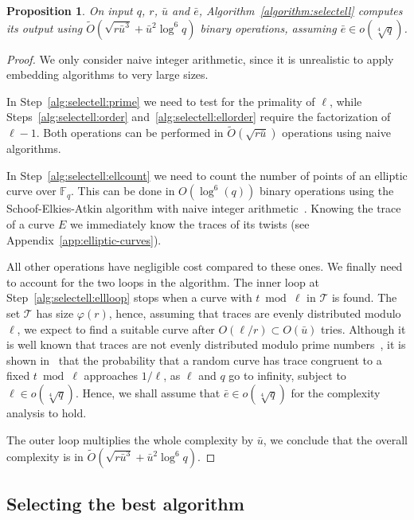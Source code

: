 \documentclass[12pt]{article}
\theoremstyle{plain}
\newtheorem{proposition}[theorem]{Proposition}
\theoremstyle{definition}
\newcommand{\tildO}{\tilde{O}}
\def\F{\ensuremath{\mathbb{F}}}
\def\euler{\ensuremath{\varphi}}
\newcounter{algorithm}
\begin{document}
\begin{proposition}
  On input $q$, $r$, $\bar{u}$ and $\bar{e}$,
  Algorithm~\ref{algorithm:selectell} computes its output using
  $\tildO\left(\sqrt{r\bar{u}^3} + \bar{u}^2\log^6{q}\right)$ binary
  operations, assuming $\bar{e}\in o(\sqrt[4]{q})$.
\end{proposition}
\begin{proof}
  We only consider naive integer arithmetic, since it is unrealistic
  to apply embedding algorithms to very large sizes.

  In Step~\ref{alg:selectell:prime} we need to test for the primality
  of $\ell$, while Steps~\ref{alg:selectell:order}
  and~\ref{alg:selectell:ellorder} require the factorization of
  $\ell-1$. Both operations can be performed in
  $\tildO(\sqrt{r\bar{u}})$ operations using naive algorithms.

  In Step~\ref{alg:selectell:ellcount} we need to count the number
  of points of an elliptic curve over $\F_q$. This can be done in
  $O\left(\log^6(q)\right)$ binary operations using the
  Schoof-Elkies-Atkin algorithm with naive integer
  arithmetic~\cite{schoof95,lercier+sirvent08}. Knowing the trace of a
  curve $E$ we immediately know the traces of its twists (see
  Appendix~\ref{app:elliptic-curves}).

  All other operations have negligible cost compared to these ones. We
  finally need to account for the two loops in the algorithm. The
  inner loop at Step~\ref{alg:selectell:ellloop} stops when a curve
  with $t\bmod\ell$ in $\mathcal{T}$ is found. The set $\mathcal{T}$
  has size $\euler(r)$, hence, assuming that traces are evenly
  distributed modulo $\ell$, we expect to find a suitable curve after
  $O(\ell/r)\subset O(\bar{u})$ tries. Although it is well known that
  traces are not evenly distributed modulo prime
  numbers~\cite{lenstra87}, it is shown
  in~\cite[Th.~1]{castryck+hubrechts13} that the probability that a
  random curve has trace congruent to a fixed $t\bmod\ell$ approaches
  $1/\ell$, as $\ell$ and $q$ go to infinity, subject to $\ell\in
  o(\sqrt[4]{q})$. Hence, we shall assume that $\bar{e}\in
  o(\sqrt[4]{q})$ for the complexity analysis to hold.

  The outer loop multiplies the whole complexity by $\bar{u}$, we
  conclude that the overall complexity is in
  $\tildO\left(\sqrt{r\bar{u}^3} + \bar{u}^2\log^6{q}\right)$.
\end{proof}


\subsection{Selecting the best algorithm}
\end{document}
